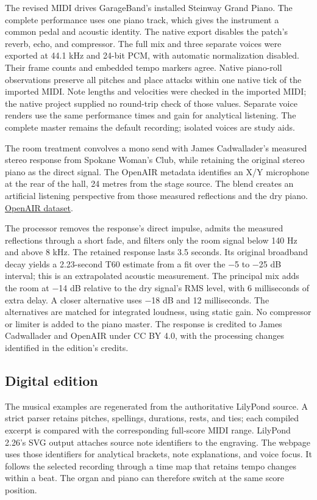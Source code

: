 \documentclass[11pt,a4paper]{article}
\begin{document}
The revised MIDI drives GarageBand's installed Steinway Grand Piano. The complete performance uses one piano track, which gives the instrument a common pedal and acoustic identity. The native export disables the patch's reverb, echo, and compressor. The full mix and three separate voices were exported at 44.1 kHz and 24-bit PCM, with automatic normalization disabled. Their frame counts and embedded tempo markers agree. Native piano-roll observations preserve all pitches and place attacks within one native tick of the imported MIDI. Note lengths and velocities were checked in the imported MIDI; the native project supplied no round-trip check of those values. Separate voice renders use the same performance times and gain for analytical listening. The complete master remains the default recording; isolated voices are study aids.

The room treatment convolves a mono send with James Cadwallader's measured stereo response from Spokane Woman's Club, while retaining the original stereo piano as the direct signal. The OpenAIR metadata identifies an X/Y microphone at the rear of the hall, 24 metres from the stage source. The blend creates an artificial listening perspective from those measured reflections and the dry piano. \href{https://www.openair.hosted.york.ac.uk/?page_id=659}{OpenAIR dataset}.

The processor removes the response's direct impulse, admits the measured reflections through a short fade, and filters only the room signal below 140 Hz and above 8 kHz. The retained response lasts 3.5 seconds. Its original broadband decay yields a 2.23-second T60 estimate from a fit over the −5 to −25 dB interval; this is an extrapolated acoustic measurement. The principal mix adds the room at −14 dB relative to the dry signal's RMS level, with 6 milliseconds of extra delay. A closer alternative uses −18 dB and 12 milliseconds. The alternatives are matched for integrated loudness, using static gain. No compressor or limiter is added to the piano master. The response is credited to James Cadwallader and OpenAIR under CC BY 4.0, with the processing changes identified in the edition's credits.

\subsection{Digital edition}\label{digital-edition}

The musical examples are regenerated from the authoritative LilyPond source. A strict parser retains pitches, spellings, durations, rests, and ties; each compiled excerpt is compared with the corresponding full-score MIDI range. LilyPond 2.26's SVG output attaches source note identifiers to the engraving. The webpage uses those identifiers for analytical brackets, note explanations, and voice focus. It follows the selected recording through a time map that retains tempo changes within a beat. The organ and piano can therefore switch at the same score position.
\end{document}
